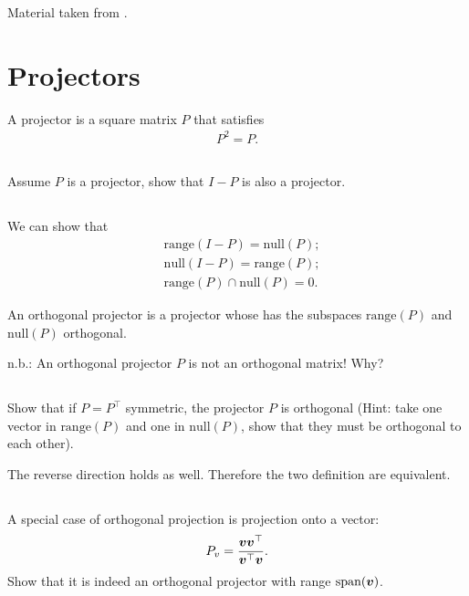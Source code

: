 \documentclass[11pt,letterpaper]{article}
\begin{document}
Material taken from \cite[Lecture 6 and 10]{TrefethenBau_97}.

\section{Projectors}
A projector is a square matrix $P$ that satisfies
\begin{align*}
    P^2 = P.
\end{align*}

\subsection{}
Assume $P$ is a projector, show that $I-P$ is also a projector.

\subsection{}
We can show that
\begin{align*}
    & \text{range}(I-P) = \text{null}(P);\\
    & \text{null}(I-P) = \text{range}(P);\\
    & \text{range}(P) \cap \text{null}(P) = 0.
\end{align*}

An orthogonal projector is a projector whose has the subspaces $\text{range}(P)$ and $\text{null}(P)$ orthogonal.

n.b.: An orthogonal projector $P$ is not an orthogonal matrix! Why?

\subsection{}
Show that if $P=P^\top$ symmetric, the projector $P$ is orthogonal (Hint: take one vector in $\text{range}(P)$ and one in $\text{null}(P)$, show that they must be orthogonal to each other). 

The reverse direction holds as well. Therefore the two definition are equivalent.

\subsection{}
A special case of orthogonal projection is projection onto a vector:
\begin{align*}
    P_v = \frac{\boldsymbol{v} \boldsymbol{v}^\top}{\boldsymbol{v}^\top \boldsymbol{v}}.
\end{align*}
Show that it is indeed an orthogonal projector with range $\text{span}(\boldsymbol{v})$.
\end{document}
